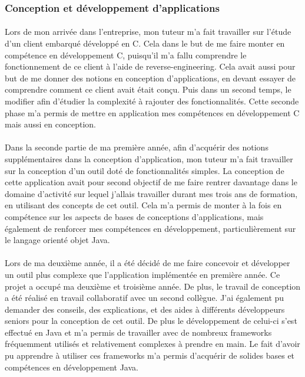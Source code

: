 \documentclass[12pt,a4paper]{report}
\begin{document}
\subsubsection{Conception et développement d'applications}
\paragraph*{}Lors de mon arrivée dans l’entreprise, mon tuteur m’a fait travailler sur l’étude d’un client embarqué développé en C. Cela dans le but de me faire monter en compétence en développement C, puisqu’il m’a fallu comprendre le fonctionnement de ce client  à l’aide de reverse-engineering. Cela avait aussi pour but de me donner des notions en conception d’applications, en devant essayer de comprendre comment ce client avait était conçu. Puis dans un second temps, le modifier afin d'étudier la complexité à rajouter des fonctionnalités. Cette seconde phase m'a permis de mettre en application mes compétences en développement C mais aussi en conception.
\paragraph*{}Dans la seconde partie de ma première année, afin d’acquérir des notions supplémentaires dans la conception d’application, mon tuteur m’a fait travailler sur la conception d’un outil doté de fonctionnalités simples. La conception de cette application avait pour second objectif de me faire rentrer davantage dans le domaine d’activité sur lequel j’allais travailler durant mes trois ans de formation, en utilisant des concepts de cet outil. Cela m’a permis de monter à la fois en compétence sur les aspects de bases de conceptions d’applications, mais également de renforcer mes compétences en développement, particulièrement sur le langage orienté objet Java.
\paragraph*{}Lors de ma deuxième année, il a été décidé de me faire concevoir et développer un outil plus complexe que l’application implémentée en première année. Ce projet a occupé ma deuxième et troisième année. De plus, le travail de conception a été réalisé en travail collaboratif avec un second collègue. J’ai également pu demander des conseils, des explications, et des aides à différents développeurs seniors pour la conception de cet outil. De plus le développement de celui-ci s’est effectué en Java et m’a permis de travailler avec de nombreux frameworks fréquemment utilisés et relativement complexes à prendre en main. Le fait d’avoir pu apprendre à utiliser ces frameworks m’a permis d’acquérir de solides bases et compétences en développement Java.
\end{document}
